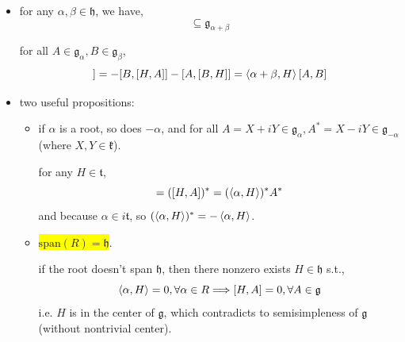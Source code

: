\begin{itemize}
	\item for any $\alpha, \beta \in \mathfrak{h}$, we have,
	\begin{equation}
		[\mathfrak{g}_\alpha, \mathfrak{g}_\beta] \subseteq \mathfrak{g}_{\alpha + \beta}
	\end{equation}
	
	\begin{tcolorbox}[title=proof:]
		for all $A \in \mathfrak{g}_\alpha, B \in \mathfrak{g}_\beta$,
		\begin{equation}
			[H, [A, B]] = - [B, [H, A]] - [A, [B, H]] = \braket{\alpha + \beta, H} [A, B]
		\end{equation}
	\end{tcolorbox}
	
	\item two useful propositions:
	\begin{itemize}
		\item if $\alpha$ is a root, so does $- \alpha$, and for all $A = X + i Y \in \mathfrak{g}_\alpha, A^* = X - i Y \in \mathfrak{g}_{- \alpha}$ (where $X, Y \in \mathfrak{k}$).
		
		\begin{tcolorbox}[title=proof:]
			for any $H \in \mathfrak{t}$,
			\begin{equation}
				[H, A^*] = ([H, A])^* = (\braket{\alpha, H})^* A^*
			\end{equation}
			and because $\alpha \in i \mathfrak{t}$, so $(\braket{\alpha, H})^* = - \braket{\alpha, H}$.
		\end{tcolorbox}
		
		\item \colorbox{yellow}{$\mathrm{span}(R) = \mathfrak{h}$}.
		
		\begin{tcolorbox}[title=proof:]
			if the root doesn't span $\mathfrak{h}$, then there nonzero exists $H \in \mathfrak{h}$ s.t.,
			\begin{equation}
				\braket{\alpha, H} = 0, \forall \alpha \in R \Longrightarrow [H, A] = 0, \forall A \in \mathfrak{g}
			\end{equation}
			i.e. $H$ is in the center of $\mathfrak{g}$, which contradicts to semisimpleness of $\mathfrak{g}$ (without nontrivial center).
		\end{tcolorbox}
	\end{itemize}
\end{itemize}

